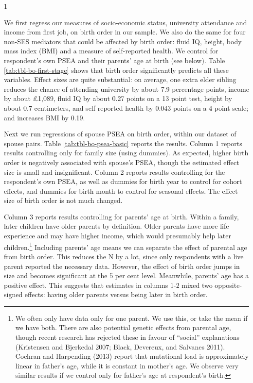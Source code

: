 \documentclass[
]{article}
\theoremstyle{definition}
\theoremstyle{definition}
\theoremstyle{definition}
\theoremstyle{definition}
\theoremstyle{remark}
\begin{document}
\begin{table}[ht]
\begin{centerbox}
\begin{threeparttable}
\begin{tabularx}{1\textwidth}
\hhline{}
\end{tabularx}
\end{threeparttable}\par\end{centerbox}

\end{table}
 

We first regress our measures of socio-economic status, university attendance
and income from first job, on birth order in our sample. We also do the same for
four non-SES mediators that could be affected by birth order: fluid IQ, height,
body mass index (BMI) and a measure of self-reported health. We control for
respondent's own PSEA and their parents' age at birth (see below). Table
\ref{tab:tbl-bo-first-stage} shows that birth order significantly predicts all
these variables. Effect sizes are quite substantial: on average, one extra elder
sibling reduces the chance of attending university by about
7.9 percentage points, income by about
£1,089, fluid IQ by about
0.27 points on a 13 point test, height by about
0.7 centimeters, and self reported health by
0.043 points on a 4-point scale; and increases BMI by
0.19.

Next we run regressions of spouse PSEA on birth order, within our dataset of
spouse pairs. Table \ref{tab:tbl-bo-psea-basic} reports the results. Column 1
reports results controlling only for family size (using dummies). As expected,
higher birth order is negatively associated with spouse's PSEA, though the
estimated effect size is small and insignificant. Column 2 reports results
controlling for the respondent's own PSEA, as well as dummies for birth year to
control for cohort effects, and dummies for birth month to control for
seasonal effects. The effect size of birth order is not much changed.

Column 3 reports results controlling for parents' age at birth. Within a family,
later children have older parents by definition. Older parents have more life
experience and may have higher income, which would presumably help later
children.\footnote{We often only have data only for one parent. We use this, or take the mean
  if we have both. There are also potential genetic effects from parental age,
  though recent research has rejected these in favour of ``social'' explanations
  (Kristensen and Bjerkedal 2007; Black, Devereux, and Salvanes 2011). Cochran and Harpending (2013) report that
  mutational load is approximately linear in father's age, while it is constant in
  mother's age. We observe very similar results if we control only for father's
  age at respondent's birth.} Including parents' age means we can separate the effect of
parental age from birth order. This reduces the N by a lot, since only
respondents with a live parent reported the necessary data. However, the effect
of birth order jumps in size and becomes significant at the 5 per cent level.
Meanwhile, parents' age has a positive effect. This suggests that estimates in
columns 1-2 mixed two opposite-signed effects: having older parents versus being
later in birth order.
\end{document}
